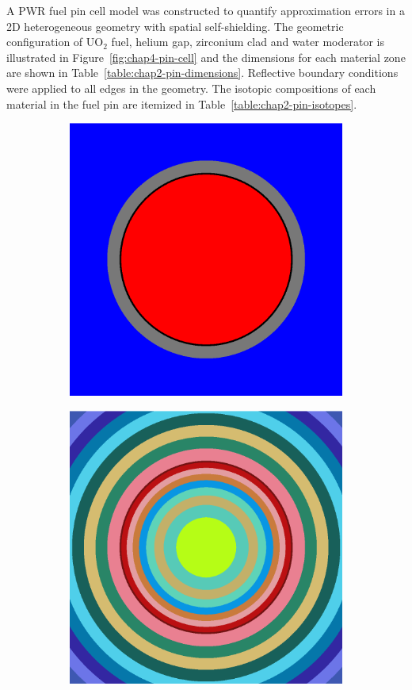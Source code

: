 A \ac{PWR} fuel pin cell model was constructed to quantify approximation errors in a 2D heterogeneous geometry with spatial self-shielding. The geometric configuration of UO$_2$ fuel, helium gap, zirconium clad and water moderator is illustrated in Figure~\ref{fig:chap4-pin-cell} and the dimensions for each material zone are shown in Table~\ref{table:chap2-pin-dimensions}. Reflective boundary conditions were applied to all edges in the geometry. The isotopic compositions of each material in the fuel pin are itemized in Table~\ref{table:chap2-pin-isotopes}. 

\begin{figure}[h!]
\begin{subfigure}{.33\textwidth}
  \centering
  \includegraphics[width=0.9\linewidth]{figures/biases/pin-cell/pin-cell-simple}
  \caption{}
\end{subfigure}%
\begin{subfigure}{.33\textwidth}
  \centering
  \includegraphics[width=0.9\linewidth]{figures/biases/pin-cell/pin-cell-8x}

\end{subfigure}
\end{figure}
